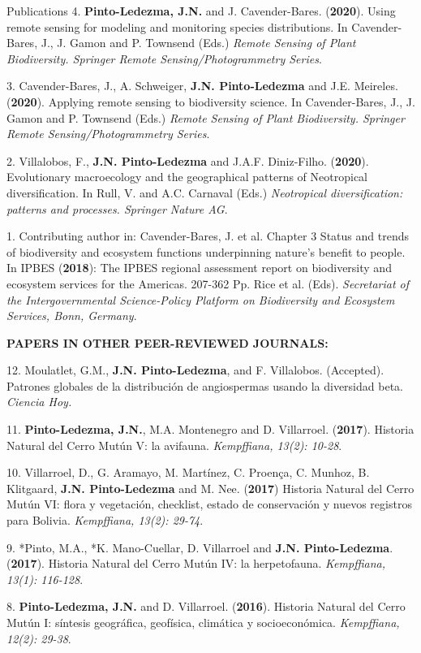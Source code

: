\documentclass{resume} %
\begin{document}
\begin{rSection}{Publications}
{4.} {\bf{Pinto-Ledezma, J.N.}} {and J. Cavender-Bares. ({{\bf 2020}}). Using remote sensing for modeling and monitoring species distributions. In Cavender-Bares, J., J. Gamon and P. Townsend (Eds.)} {\em Remote Sensing of Plant Biodiversity. Springer Remote Sensing/Photogrammetry Series}.

{3.} {Cavender-Bares, J., A. Schweiger,} {\bf{J.N. Pinto-Ledezma}} {and J.E. Meireles. ({{\bf 2020}}). Applying remote sensing to biodiversity science. In Cavender-Bares, J., J. Gamon and P. Townsend (Eds.)} {\em Remote Sensing of Plant Biodiversity. Springer Remote Sensing/Photogrammetry Series}. 

{2.} {Villalobos, F.,} {\bf{J.N. Pinto-Ledezma}} {and J.A.F. Diniz-Filho. ({{\bf 2020}}). Evolutionary macroecology and the geographical patterns of Neotropical diversification. In Rull, V. and A.C. Carnaval (Eds.)} {\em Neotropical diversification: patterns and processes. Springer Nature AG}. 

{1.} {Contributing author in: Cavender-Bares, J. et al. Chapter 3 Status and trends of biodiversity and ecosystem functions underpinning nature’s benefit to people. In IPBES ({{\bf 2018}}): {The IPBES regional assessment report on biodiversity and ecosystem services for the Americas}. 207-362 Pp. Rice et al. (Eds).} {\em Secretariat of the Intergovernmental Science-Policy Platform on Biodiversity and Ecosystem Services, Bonn, Germany}. 

{\bf PAPERS IN OTHER PEER-REVIEWED JOURNALS:} 

{12.} {Moulatlet, G.M.,} {\bf{J.N. Pinto-Ledezma}}, {and F. Villalobos. (Accepted). Patrones globales de la distribución de angiospermas usando la diversidad beta.} {\em Ciencia Hoy.}

{11.} {\bf{Pinto-Ledezma, J.N.}}, {M.A. Montenegro and D. Villarroel. ({{\bf 2017}}). Historia Natural del Cerro Mutún V: la avifauna.} {\em Kempffiana, 13(2): 10-28}.

{10.} {Villarroel, D., G. Aramayo, M. Martínez, C. Proença, C. Munhoz, B. Klitgaard,} {\bf{J.N. Pinto-Ledezma}} {and M. Nee. ({{\bf 2017}}) Historia Natural del Cerro Mutún VI: flora y vegetación, checklist, estado de conservación y nuevos registros para Bolivia.} {\em Kempffiana, 13(2): 29-74}.

{9.} {*Pinto, M.A., *K. Mano-Cuellar, D. Villarroel and} {\bf{J.N. Pinto-Ledezma}}. {({{\bf 2017}}). Historia Natural del Cerro Mutún IV: la herpetofauna.} {\em Kempffiana, 13(1): 116-128}.

{8.} {\bf{Pinto-Ledezma, J.N.}} {and D. Villarroel. ({{\bf 2016}}). Historia Natural del Cerro Mutún I: síntesis geográfica, geofísica, climática y socioeconómica.} {\em Kempffiana, 12(2): 29-38}.


\end{rSection}
\end{document}
